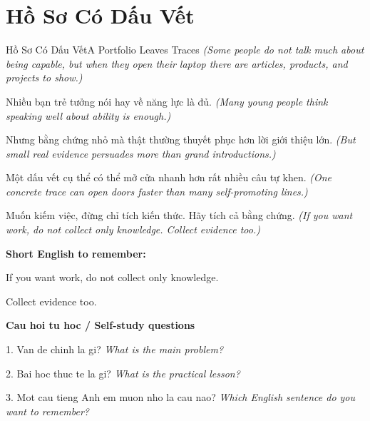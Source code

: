 \section{Hồ Sơ Có Dấu Vết}
\begin{truyen}{Hồ Sơ Có Dấu Vết}{A Portfolio Leaves Traces}
\textit{(Some people do not talk much about being capable, but when they open their laptop there are articles, products, and projects to show.)}

Nhiều bạn trẻ tưởng nói hay về năng lực là đủ.
\textit{(Many young people think speaking well about ability is enough.)}

Nhưng bằng chứng nhỏ mà thật thường thuyết phục hơn lời giới thiệu lớn.
\textit{(But small real evidence persuades more than grand introductions.)}

Một dấu vết cụ thể có thể mở cửa nhanh hơn rất nhiều câu tự khen.
\textit{(One concrete trace can open doors faster than many self-promoting lines.)}

\end{truyen}

\begin{baihoc}
Muốn kiếm việc, đừng chỉ tích kiến thức. Hãy tích cả bằng chứng.
\textit{(If you want work, do not collect only knowledge. Collect evidence too.)}
\end{baihoc}

\begin{ghinhoanh}
\textbf{Short English to remember:}

If you want work, do not collect only knowledge.

Collect evidence too.

\end{ghinhoanh}

\begin{tuhocnhanh}
\textbf{Cau hoi tu hoc / Self-study questions}

1. Van de chinh la gi? \textit{What is the main problem?}

2. Bai hoc thuc te la gi? \textit{What is the practical lesson?}

3. Mot cau tieng Anh em muon nho la cau nao? \textit{Which English sentence do you want to remember?}
\end{tuhocnhanh}
\ngancach

